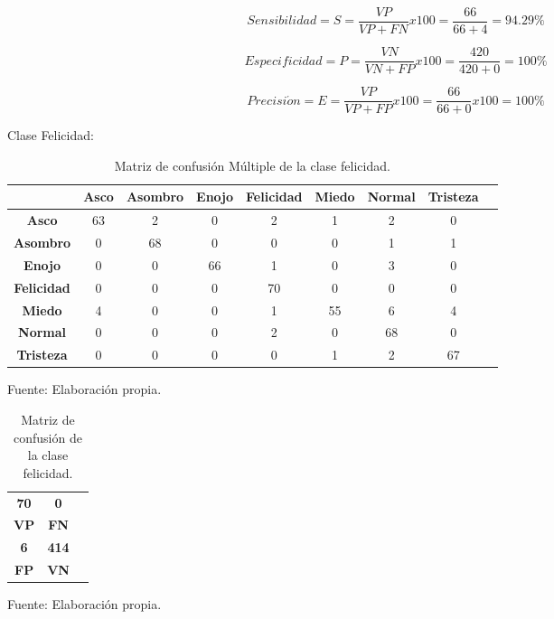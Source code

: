\begin{equation}
Sensibilidad=S=\frac{VP}{VP+FN}x100=\frac{66}{66+4}=94.29\%
\end{equation}

\begin{equation}
Especificidad=P=\frac{VN}{VN+FP}x100=\frac{420}{420+0}=100\%
\end{equation}

\begin{equation}
Precisi\acute{o}n=E=\frac{VP}{VP+FP}x100=\frac{66}{66+0}x100=100\%
\end{equation}

\vskip 5cm

Clase Felicidad:

\begin{table}[ht!]
\centering
\caption{Matriz de confusión Múltiple de la clase felicidad.} \vskip 0.1cm
\begin{tabular}{|c|c|c|c|c|c|c|c|c|} \hline
 & \bf Asco & \bf Asombro & \bf Enojo & \bf Felicidad & \bf Miedo & \bf Normal & \bf Tristeza \\ \hline
\bf Asco & 63 & 2 & 0 & 2 & 1 & 2 & 0 \\ \hline
\bf Asombro & 0 & 68 & 0 & 0 & 0 & 1 & 1 \\ \hline
\bf Enojo & 0 & 0 & 66 & 1 & 0 & 3 & 0 \\ \hline
\bf Felicidad & 0 & 0 & 0 & 70 & 0 & 0 & 0 \\ \hline
\bf Miedo & 4 & 0 & 0 & 1 & 55 & 6 & 4 \\ \hline
\bf Normal & 0 & 0 & 0 & 2 & 0 & 68 & 0 \\ \hline
\bf Tristeza & 0 & 0 & 0 & 0 & 1 & 2 & 67 \\ \hline

\end{tabular}
\begin{center}
{\small{Fuente: Elaboración propia.}}
\end{center}
\end{table}

\begin{table}[ht!]
\centering
\caption{Matriz de confusión de la clase felicidad.} \vskip 0.1cm
\begin{tabular}{|c|c|c|} \hline
\bf 70 \par & \bf 0 \par \\
\bf VP & \bf FN \\ \hline
\bf 6 \par & \bf 414 \par \\ 
\bf FP & \bf VN \\ \hline 
\end{tabular}
\begin{center}
{\small{Fuente: Elaboración propia.}}
\end{center}
\end{table}


